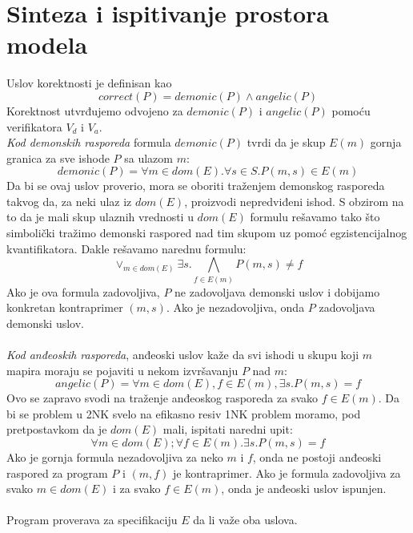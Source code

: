 \documentclass[a4paper]{article}
\begin{document}
\section{Sinteza i ispitivanje prostora modela}
Uslov korektnosti je definisan kao 
\begin{equation}
correct(P) = demonic(P) \land angelic(P)
\end{equation}
Korektnost utvrđujemo odvojeno za $demonic(P)$ i $angelic(P)$ pomoću verifikatora $V_d$ i $V_a$.\\
\textit{Kod demonskih rasporeda} formula $demonic(P)$ tvrdi da je skup $E(m)$ gornja granica za sve ishode $P$ sa ulazom $m$:
\begin{equation}
demonic(P) = \forall m \in dom(E). \forall s \in S. P(m,s) \in E(m)
\end{equation}
Da bi se ovaj uslov proverio, mora se oboriti traženjem demonskog rasporeda takvog da, za neki ulaz iz $dom(E)$, proizvodi nepredviđeni ishod. S obzirom na to da je mali skup ulaznih vrednosti u $dom(E)$ formulu rešavamo tako što simbolički tražimo demonski raspored nad tim skupom uz pomoć egzistencijalnog kvantifikatora. Dakle rešavamo narednu formulu:
\begin{equation}
\vee_{m \in dom(E)} \exists s. \bigwedge_{f \in E(m)} P(m,s) \neq f
\end{equation}
Ako je ova formula zadovoljiva, $P$ ne zadovoljava demonski uslov i dobijamo konkretan kontraprimer $(m,s)$. Ako je nezadovoljiva, onda $P$ zadovoljava demonski uslov.\\\\
\textit{Kod anđeoskih rasporeda}, anđeoski uslov kaže da svi ishodi u skupu koji $m$
mapira moraju se pojaviti u nekom izvršavanju $P$ nad $m$:
\begin{equation}
angelic(P) = \forall m \in dom(E), f \in E(m), \exists s.P(m,s) = f
\end{equation}
Ovo se zapravo svodi na traženje anđeoskog rasporeda za svako $f \in E(m)$. Da bi se problem u 2NK svelo na efikasno resiv 1NK problem moramo, pod pretpostavkom da je $dom(E)$ mali, ispitati naredni upit:
\begin{equation}
\forall m \in dom(E); \forall f \in E(m). \exists s.P(m,s) = f
\end{equation}
Ako je gornja formula nezadovoljiva za neko $m$ i $f$, onda ne postoji anđeoski raspored za program $P$ i $(m,f)$ je kontraprimer. Ako je formula zadovoljiva za svako $m \in dom(E)$ i za svako $f \in E(m)$, onda je anđeoski uslov ispunjen.\\\\
Program proverava za specifikaciju $E$ da li važe oba uslova.
\end{document}
